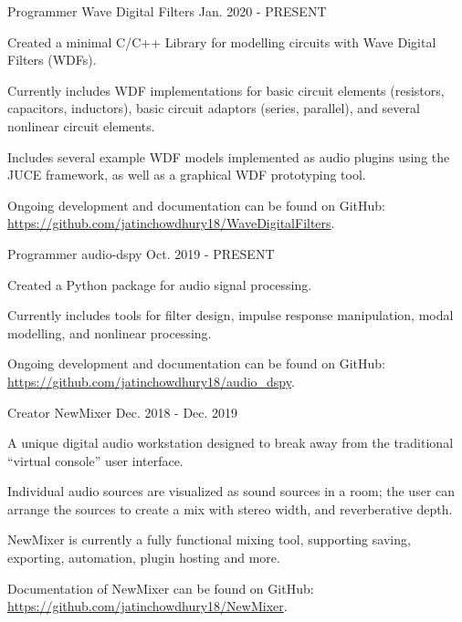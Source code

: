 \begin{cventries}
    \cventry
    {Programmer} %
    {Wave Digital Filters} %
    {} %
    {Jan. 2020 - PRESENT} %
    {
      \begin{cvitems} %
        \item {Created a minimal C/C++ Library for modelling circuits with Wave Digital Filters (WDFs).}
        \item {Currently includes WDF implementations for basic circuit elements (resistors, capacitors, inductors),
               basic circuit adaptors (series, parallel), and several nonlinear circuit elements.}
        \item {Includes several example WDF models implemented as audio plugins using the JUCE framework,
               as well as a graphical WDF prototyping tool.}
        \item {Ongoing development and documentation can be found on GitHub: \url{https://github.com/jatinchowdhury18/WaveDigitalFilters}.}
      \end{cvitems}
    }

    \cventry
    {Programmer} %
    {audio-dspy} %
    {} %
    {Oct. 2019 - PRESENT} %
    {
      \begin{cvitems} %
        \item {Created a Python package for audio signal processing.}
        \item {Currently includes tools for filter design, impulse response manipulation, modal modelling, and nonlinear processing.}
        \item {Ongoing development and documentation can be found on GitHub: \url{https://github.com/jatinchowdhury18/audio_dspy}.}
      \end{cvitems}
    }

  \cventry
    {Creator} %
    {NewMixer} %
    {} %
    {Dec. 2018 - Dec. 2019} %
    {
      \begin{cvitems} %
        \item {A unique digital audio workstation designed to break away from the traditional ``virtual console'' user interface.}
        \item {Individual audio sources are visualized as sound sources in a room; the user can arrange the sources to create a mix with stereo width, and reverberative depth.}
        \item {NewMixer is currently a fully functional mixing tool, supporting saving, exporting, automation, plugin hosting and more.}
        \item {Documentation of NewMixer can be found on GitHub: \url{https://github.com/jatinchowdhury18/NewMixer}.}
      \end{cvitems}
    }


\end{cventries}
